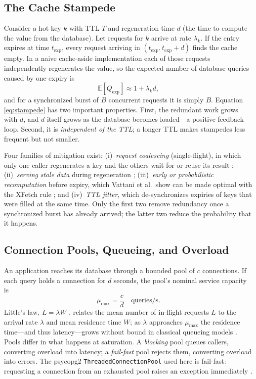 \subsection{The Cache Stampede}
\label{sec:bg-stampede}
Consider a hot key $k$ with TTL $T$ and regeneration time $d$ (the time to compute the
value from the database). Let requests for $k$ arrive at rate $\lambda_k$. If the
entry expires at time $t_{\mathrm{exp}}$, every request arriving in
$(t_{\mathrm{exp}}, t_{\mathrm{exp}}+d)$ finds the cache empty. In a naive cache-aside
implementation each of those requests independently regenerates the value, so the
expected number of database queries caused by one expiry is
\begin{equation}
\mathbb{E}[Q_{\mathrm{exp}}] \approx 1 + \lambda_k d ,
\label{eq:stampede}
\end{equation}
and for a synchronized burst of $B$ concurrent requests it is simply $B$. Equation
\eqref{eq:stampede} has two important properties. First, the redundant work grows
with $d$, and $d$ itself grows as the database becomes loaded---a positive feedback
loop. Second, it is \emph{independent of the TTL}; a longer TTL makes stampedes less
frequent but not smaller.

Four families of mitigation exist:
(i)~\emph{request coalescing} (single-flight), in which only one caller regenerates a
key and the others wait for or reuse its result \cite{nishtala2013,singleflight};
(ii)~\emph{serving stale data} during regeneration \cite{rfc5861,nygard2018};
(iii)~\emph{early or probabilistic recomputation} before expiry, which Vattani et al.\
show can be made optimal with the XFetch rule \cite{vattani2015}; and
(iv)~\emph{TTL jitter}, which de-synchronizes expiries of keys that were filled at the
same time. Only the first two remove redundancy once a synchronized burst has already
arrived; the latter two reduce the probability that it happens.

\subsection{Connection Pools, Queueing, and Overload}
\label{sec:bg-queueing}
An application reaches its database through a bounded pool of $c$ connections. If each
query holds a connection for $d$ seconds, the pool's nominal service capacity is
\begin{equation}
\mu_{\max} = \frac{c}{d}\quad\text{queries/s.}
\label{eq:capacity}
\end{equation}
Little's law, $L=\lambda W$ \cite{little1961}, relates the mean number of in-flight
requests $L$ to the arrival rate $\lambda$ and mean residence time $W$; as $\lambda$
approaches $\mu_{\max}$ the residence time---and thus latency---grows without bound in
classical queueing models \cite{kleinrock1975}. Pools differ in what happens at
saturation. A \emph{blocking} pool queues callers, converting overload into latency;
a \emph{fail-fast} pool rejects them, converting overload into errors. The psycopg2
\texttt{ThreadedConnectionPool} used here is fail-fast: requesting a connection from
an exhausted pool raises an exception immediately \cite{psycopgpool}.

